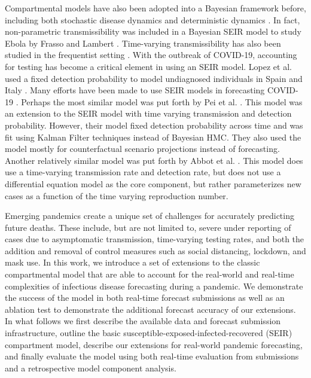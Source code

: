 \documentclass[11pt]{amsart}
\begin{document}
Compartmental models have also been adopted into a Bayesian framework before, including both stochastic disease dynamics and deterministic dynamics \cite{hotta2010bayesian}\cite{dukic2012tracking}. In fact, non-parametric transmissibility was included in a Bayesian SEIR model to study Ebola by Frasso and Lambert \cite{frasso2016bayesian}. Time-varying transmissibility has also been studied in the frequentist setting \cite{smirnova2019forecasting}. With the outbreak of COVID-19, accounting for testing has become a critical element in using an SEIR model. Lopez et al. used a fixed detection probability to model undiagnosed individuals in Spain and Italy \cite{lopez2020modified}. Many efforts have been made to use SEIR models in forecasting COVID-19 \cite{giordano2020modelling}\cite{yang2020modified} \cite{bertozzi2020challenges}\cite{prem2020effect}\cite{flaxman2020estimating}. Perhaps the most similar model was put forth by Pei et al. \cite{pei2020differential}. This model was an extension to the SEIR model with time varying transmission and detection probability. However, their model fixed detection probability across time and was fit using Kalman Filter techniques instead of Bayesian HMC. They also used the model mostly for counterfactual scenario projections instead of forecasting. Another relatively similar model was put forth by Abbot et al. \cite{abbott2020estimating}. This model does use a time-varying transmission rate and detection rate, but does not use a differential equation model as the core component, but rather parameterizes new cases as a function of the time varying reproduction number. 

Emerging pandemics create a unique set of challenges for accurately predicting future deaths. These include, but are not limited to, severe under reporting of cases due to asymptomatic transmission, time-varying testing rates, and both the addition and removal of control measures such as social distancing, lockdown, and mask use. In this work, we introduce a set of extensions to the classic compartmental model that are able to account for the real-world and real-time complexities of infectious disease forecasting during a pandemic. We demonstrate the success of the model in both real-time forecast submissions  as well as an ablation test to demonstrate the additional forecast accuracy of our extensions. In what follows we first describe the available data and forecast submission infrastructure, outline the basic susceptible-exposed-infected-recovered (SEIR) compartment model, describe our extensions for real-world pandemic forecasting, and finally evaluate the model using both real-time evaluation from submissions and a retrospective model component analysis. 
\end{document}
